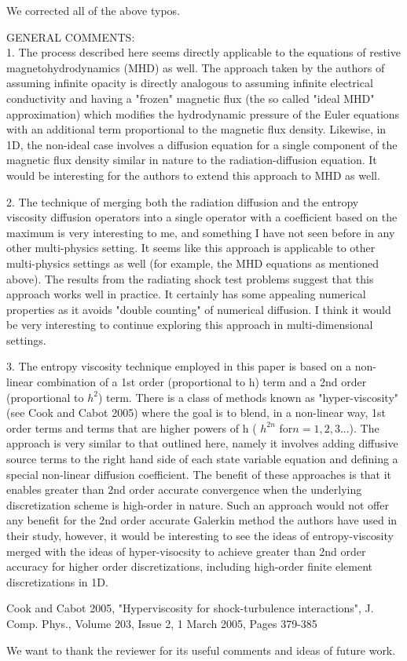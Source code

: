 \documentclass{article}
\begin{document}
We corrected all of the above typos.
\bigskip


{
\color{blue}
\noindent
GENERAL COMMENTS: \\
1. The process described here seems directly applicable to the equations of restive magnetohydrodynamics (MHD) as well. The approach taken by the authors of assuming infinite opacity is directly analogous to assuming infinite electrical conductivity and having a "frozen" magnetic flux (the so called "ideal MHD" approximation) which modifies the hydrodynamic pressure of the Euler equations with an additional term proportional to the magnetic flux density. Likewise, in 1D, the non-ideal case involves a diffusion equation for a single component of the magnetic flux density similar in nature to the radiation-diffusion equation. It would be interesting for the authors to extend this approach to MHD as well.}
\bigskip


{
\color{blue}
2. The technique of merging both the radiation diffusion and the entropy viscosity diffusion operators into a single operator with a coefficient based on the maximum is very interesting to me, and something I have not seen before in any other multi-physics setting. It seems like this approach is applicable to other multi-physics settings as well (for example, the MHD equations as mentioned above). The results from the radiating shock test problems suggest that this approach works well in practice. It certainly has some appealing numerical properties as it avoids "double counting" of numerical diffusion. I think it would be very interesting to continue exploring this approach in multi-dimensional settings.
}
\bigskip


{
\color{blue}
3. The entropy viscosity technique employed in this paper is based on a non-linear combination of a 1st order (proportional to h) term and a 2nd order (proportional to $h^2$) term. There is a class of methods known as "hyper-viscosity" (see Cook and Cabot 2005) where the goal is to blend, in a non-linear way, 1st order terms and terms that are higher powers of h ( $h^{2n}$ for$ n = 1,2,3$...). The approach is very similar to that outlined here, namely it involves adding diffusive source terms to the right hand side of each state variable equation and defining a special non-linear diffusion coefficient. The benefit of these approaches is that it enables greater than 2nd order accurate convergence when the underlying discretization scheme is high-order in nature. Such an approach would not offer any benefit for the 2nd order accurate Galerkin method the authors have used in their study, however, it would be interesting to see the ideas of entropy-viscosity merged with the ideas of
hyper-visocsity to achieve greater than 2nd order accuracy for higher order discretizations, including high-order finite element discretizations in 1D.

Cook and Cabot 2005, "Hyperviscosity for shock-turbulence interactions", J. Comp. Phys., Volume 203, Issue 2, 1 March 2005, Pages 379-385
}
\bigskip

We want to thank the reviewer for its useful comments and ideas of future work.
\end{document}
